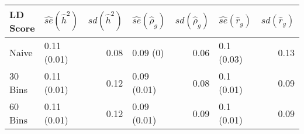 \begin{table}[ht]
\centering
\begin{tabular}{llrlrlr}
  \hline
LD Score & $\widehat{se}(\hat{h}^2)$ & $sd(\hat{h}^2)$ & $\widehat{se}(\hat{\rho}_g)$ & $sd(\hat{\rho}_g)$ & $\widehat{se}(\hat{r}_g)$ & $sd(\hat{r}_g)$ \\ 
  \hline
Naive & 0.11 (0.01) & 0.08 & 0.09 (0) & 0.06 & 0.1 (0.03) & 0.13 \\ 
  30 Bins & 0.11 (0.01) & 0.12 & 0.09 (0.01) & 0.08 & 0.1 (0.01) & 0.09 \\ 
  60 Bins & 0.11 (0.01) & 0.12 & 0.09 (0.01) & 0.09 & 0.1 (0.01) & 0.09 \\ 
   \hline
\end{tabular}
\end{table}
